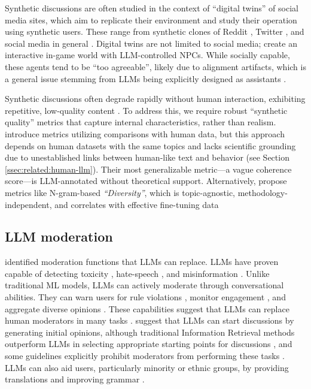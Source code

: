 Synthetic discussions are often studied in the context of “digital twins” of social media sites, which aim to replicate their environment and study their operation using synthetic users. These range from synthetic clones of Reddit \cite{park_simulacra}, Twitter \cite{mou_2024}, and social media in general \cite{tornberg_2023, y_social}. Digital twins are not limited to social media; \citet{Park2023GenerativeAI} create an interactive in-game world with \ac{LLM}-controlled \acp{NPC}. While socially capable, these agents tend to be “too agreeable”, likely due to alignment artifacts, which is a general issue stemming from \acp{LLM} being explicitly designed as assistants \cite{anthis_2025}. 

Synthetic discussions often degrade rapidly without human interaction, exhibiting repetitive, low-quality content \citep{ulmer2024}. To address this, we require robust “synthetic quality” metrics that capture internal characteristics, rather than realism. \citet{balog_2024} introduce metrics utilizing comparisons with human data, but this approach depends on human datasets with the same topics and lacks scientific grounding due to unestablished links between human-like text and behavior (see Section \ref{ssec:related:human-llm}). Their most generalizable metric—a vague coherence score—is \ac{LLM}-annotated without theoretical support. Alternatively, \citet{ulmer2024} propose metrics like N-gram-based \textit{“Diversity”}, which is topic-agnostic, methodology-independent, and correlates with effective fine-tuning data


\subsection{LLM moderation}

\citet{korre2025evaluation} identified moderation functions that \acp{LLM} can replace. \acp{LLM} have proven capable of detecting toxicity \cite{kang-qian-2024-implanting, Wang2022ToxicityDW}, hate-speech \cite{Nirmal2024TowardsIH, shi-2024-hatespeech}, and misinformation \cite{Liu2024DetectIJ, Xu2024ACS}. Unlike traditional \ac{ML} models, \acp{LLM} can actively moderate through conversational abilities. They can warn users for rule violations \cite{Kumar_AbuHashem_Durumeric_2024}, monitor engagement \cite{schroeder-etal-2024-fora}, and aggregate diverse opinions \cite{small-polis-llm}. These capabilities suggest that \acp{LLM} can replace human moderators in many tasks \cite{small-polis-llm, seering_self_moderation}. \citet{small-polis-llm} suggest that \acp{LLM} can start discussions by generating initial opinions, although traditional Information Retrieval methods outperform \acp{LLM} in selecting appropriate starting points for discussions \cite{karadzhov2023delidata}, and some guidelines explicitly prohibit moderators from performing these tasks \cite{dimitra-book}. \acp{LLM} can also aid users, particularly minority or ethnic groups, by providing translations and improving grammar \cite{Tsai2024Generative}. 

